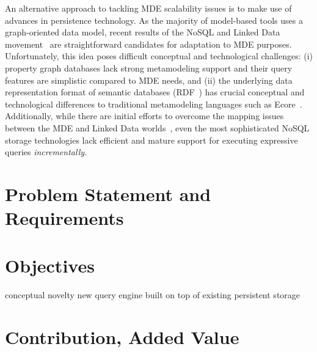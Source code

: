 An alternative approach to tackling MDE scalability issues is to make use of advances in persistence technology. As the majority of model-based tools uses a graph-oriented data model, recent results of the NoSQL and Linked Data movement~\cite{neo4j,openvirtuoso,sesame} are straightforward candidates for adaptation to MDE purposes. Unfortunately, this idea poses difficult conceptual and technological challenges: (i) property graph databases lack strong metamodeling support and their query features are simplistic compared to MDE needs, and (ii) the underlying data representation format of semantic databases (RDF~\cite{website:rdf_standard}) has crucial conceptual and technological differences to traditional metamodeling languages such as Ecore~\cite{EMF}. Additionally, while there are initial efforts to overcome the mapping issues between the MDE and Linked Data worlds~\cite{hillairet2008bridging}, even the most sophisticated NoSQL storage technologies lack efficient and mature support for executing expressive queries \emph{incrementally}.

\section{Problem Statement and Requirements}

\cite{Scheidgen12}


\section{Objectives}



conceptual novelty
new query engine built on top of existing persistent storage

\section{Contribution, Added Value}

